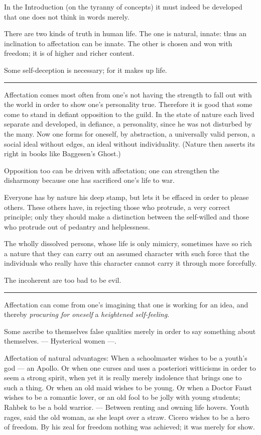 \documentclass[12pt]{article}
\newcommand{\opage}[1]{\marginnote{\footnotesize\textit{[#1]}}}
\newcommand{\ombreak}{\par\medskip\begin{center}\rule{0.32\textwidth}{0.4pt}\end{center}\medskip}
\begin{document}
In the Introduction (on the tyranny of concepts) it must indeed be developed that one does not think in words merely.

There are two kinds of truth in human life. The one is natural, innate: thus an inclination to affectation can be innate. The other is chosen and won with freedom; it is of higher and richer content.

Some self-deception is necessary; for it makes up life.

\ombreak

Affectation comes most often from one's not having the strength to fall out with the world in order to show one's personality true. Therefore it is good that some come to stand in defiant opposition to the guild. In the state of nature each lived separate and developed, in defiance, a personality, since he was not disturbed by the many. Now one forms for oneself, by abstraction, a universally valid \opage{177}person, a social ideal without edges, an ideal without individuality. (Nature then asserts its right in books like Baggesen's Ghost.)

Opposition too can be driven with affectation; one can strengthen the disharmony because one has sacrificed one's life to war.

Everyone has by nature his deep stamp, but lets it be effaced in order to please others. These others have, in rejecting those who protrude, a very correct principle; only they should make a distinction between the self-willed and those who protrude out of pedantry and helplessness.

The wholly dissolved persons, whose life is only mimicry, sometimes have so rich a nature that they can carry out an assumed character with such force that the individuals who really have this character cannot carry it through more forcefully.

The incoherent are too bad to be evil.

\ombreak

Affectation can come from one's imagining that one is working for an idea, and thereby \emph{procuring for oneself} a \emph{heightened self-feeling}.

Some ascribe to themselves false qualities merely in order to say something about themselves. --- Hysterical women ---.

Affectation of natural advantages: When a schoolmaster wishes to be a youth's god --- an Apollo. Or when one curses and uses a posteriori witticisms in order to seem a strong spirit, when yet it is really merely indolence that brings one to such a thing. Or \opage{178}when an old maid wishes to be young. Or when a Doctor Faust wishes to be a romantic lover, or an old fool to be jolly with young students; Rahbek to be a bold warrior. --- Between renting and owning life hovers. Youth rages, said the old woman, as she leapt over a straw. Cicero wishes to be a hero of freedom. By his zeal for freedom nothing was achieved; it was merely for show.
\end{document}
